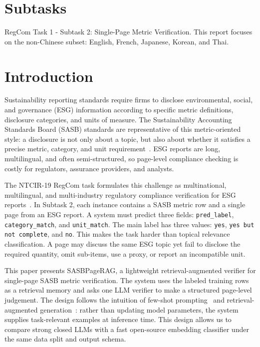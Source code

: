 \documentclass[sigconf,article]{acmart}
\newcommand{\SASBPageRAG}{SASB\-Page\-RAG}
\newcommand{\retraug}{retrieval\allowbreak-augmented}
\newcommand{\openSource}{open\allowbreak-source}
\begin{document}
\section*{Subtasks}
RegCom Task 1 - Subtask 2: Single-Page Metric Verification. This report focuses on the non-Chinese subset: English, French, Japanese, Korean, and Thai.

\section{Introduction}
Sustainability reporting standards require firms to disclose environmental, social, and governance (ESG) information according to specific metric definitions, disclosure categories, and units of measure. The Sustainability Accounting Standards Board (SASB) standards are representative of this metric-oriented style: a disclosure is not only about a topic, but also about whether it satisfies a precise metric, category, and unit requirement~\cite{sasb2023standards}. ESG reports are long, multilingual, and often semi-structured, so page-level compliance checking is costly for regulators, assurance providers, and analysts.

The NTCIR-19 RegCom task formulates this challenge as multinational, multilingual, and multi-industry regulatory compliance verification for ESG reports~\cite{seki2026overview,ntcir19regcom}. In Subtask 2, each instance contains a SASB metric row and a single page from an ESG report. A system must predict three fields: \texttt{pred\_label}, \texttt{category\_match}, and \texttt{unit\_match}. The main label has three values: \texttt{yes}, \texttt{yes but not complete}, and \texttt{no}. This makes the task harder than topical relevance classification. A page may discuss the same ESG topic yet fail to disclose the required quantity, omit sub-items, use a proxy, or report an incompatible unit.

This paper presents \SASBPageRAG{}, a lightweight \retraug{} verifier for single-page SASB metric verification. The system uses the labeled training rows as a retrieval memory and asks one LLM verifier to make a structured page-level judgement. The design follows the intuition of few-shot prompting~\cite{brown2020language} and \retraug{} generation~\cite{lewis2020retrieval}: rather than updating model parameters, the system supplies task-relevant examples at inference time. This design allows us to compare strong closed LLMs with a fast \openSource{} embedding classifier under the same data split and output schema.
\end{document}
